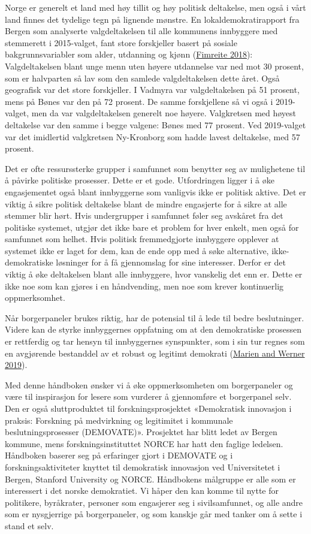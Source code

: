 \documentclass[
  12pt,
  a4paper, 12pt]{article}
\begin{document}
Norge er generelt et land med høy tillit og høy politisk deltakelse, men også i vårt land finnes det tydelige tegn på lignende mønstre. En lokaldemokratirapport fra Bergen som analyserte valgdeltakelsen til alle kommunens innbyggere med stemmerett i 2015-valget, fant store forskjeller basert på sosiale bakgrunnsvariabler som alder, utdanning og kjønn (\protect\hyperlink{ref-fimreitebyen}{Fimreite 2018}): Valgdeltakelsen blant unge menn uten høyere utdannelse var ned mot 30 prosent, som er halvparten så lav som den samlede valgdeltakelsen dette året. Også geografisk var det store forskjeller. I Vadmyra var valgdeltakelsen på 51 prosent, mens på Bønes var den på 72 prosent. De samme forskjellene så vi også i 2019-valget, men da var valgdeltakelsen generelt noe høyere. Valgkretsen med høyest deltakelse var den samme i begge valgene: Bønes med 77 prosent. Ved 2019-valget var det imidlertid valgkretsen Ny-Kronborg som hadde lavest deltakelse, med 57 prosent.

Det er ofte ressurssterke grupper i samfunnet som benytter seg av mulighetene til å påvirke politiske prosesser. Dette er et gode. Utfordringen ligger i å øke engasjementet også blant innbyggerne som vanligvis ikke er politisk aktive. Det er viktig å sikre politisk deltakelse blant de mindre engasjerte for å sikre at alle stemmer blir hørt. Hvis undergrupper i samfunnet føler seg avskåret fra det politiske systemet, utgjør det ikke bare et problem for hver enkelt, men også for samfunnet som helhet. Hvis politisk fremmedgjorte innbyggere opplever at systemet ikke er laget for dem, kan de ende opp med å søke alternative, ikke-demokratiske løsninger for å få gjennomslag for sine interesser. Derfor er det viktig å øke deltakelsen blant alle innbyggere, hvor vanskelig det enn er. Dette er ikke noe som kan gjøres i en håndvending, men noe som krever kontinuerlig oppmerksomhet.

Når borgerpaneler brukes riktig, har de potensial til å lede til bedre beslutninger. Videre kan de styrke innbyggernes oppfatning om at den demokratiske prosessen er rettferdig og tar hensyn til innbyggernes synspunkter, som i sin tur regnes som en avgjørende bestanddel av et robust og legitimt demokrati (\protect\hyperlink{ref-marien2019fair}{Marien and Werner 2019}).

Med denne håndboken ønsker vi å øke oppmerksomheten om borgerpaneler og være til inspirasjon for lesere som vurderer å gjennomføre et borgerpanel selv. Den er også sluttproduktet til forskningsprosjektet «Demokratisk innovasjon i praksis: Forskning på medvirkning og legitimitet i kommunale beslutningsprosesser (DEMOVATE)». Prosjektet har blitt ledet av Bergen kommune, mens forskningsinstituttet NORCE har hatt den faglige ledelsen. Håndboken baserer seg på erfaringer gjort i DEMOVATE og i forskningsaktiviteter knyttet til demokratisk innovasjon ved Universitetet i Bergen, Stanford University og NORCE. Håndbokens målgruppe er alle som er interessert i det norske demokratiet. Vi håper den kan komme til nytte for politikere, byråkrater, personer som engasjerer seg i sivilsamfunnet, og alle andre som er nysgjerrige på borgerpaneler, og som kanskje går med tanker om å sette i stand et selv.
\end{document}
